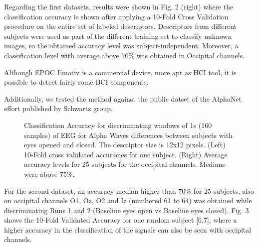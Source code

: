 Regarding the first datasets, results were shown in Fig. 2 (right) where the classification accuracy is shown after applying a 10-Fold Cross Validation procedure on the entire set of labeled descriptors.  Descriptors from different subjects were used as part of the different training set to classify unknown images, so the obtained accuracy level was subject-independent.  Moreover, a classification level with average above $70\%$ was obtained in Occipital channels.
   
Although EPOC Emotiv is a commercial device, more apt as HCI tool, it is possible to detect fairly some BCI components.
      
Additionally, we tested the method against the public datset of the AlphaNet effort published by Schwartz group.

  \begin{figure}[thpb]
      \centering
      \setlength\fboxsep{0pt}
	  \setlength\fboxrule{0.5pt}
      \caption[Classification Accuracy of Alpha Waves]{Classification Accuracy for discriminating windows of 1s (160 samples) of EEG for Alpha Waves differences between subjects with eyes opened and closed. The descriptor size is 12x12 pixels. (Left) 10-Fold cross validated accuracies for one subject.  (Right) Average accuracy levels for 25 subjects for the occipital channels. Medians were above $75\%$.}
      \label{figure1}
   \end{figure}   

For the second dataset, an accuracy median higher than $70\%$ for 25 subjects, also on occipital channels O1, Oz, O2 and Iz (numbered 61 to 64) was obtained while discriminating Runs 1 and 2 (Baseline eyes open vs Baseline eyes closed). Fig. 3 shows the 10-Fold Validated Accuracy for one random subject [6,7], where a higher accuracy in the classification of the signals can also be seen with occipital channels.  

